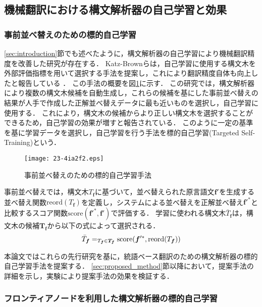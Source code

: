 \documentclass[japanese]{jnlp_1.4}
\newcommand{\argmax}{}
\begin{document}
\subsection{機械翻訳における構文解析器の自己学習と効果}

\subsubsection{事前並べ替えのための標的自己学習}
\label{sec:mt_selftrain}

\ref{sec:introduction}節でも述べたように，構文解析器の自己学習により機械翻訳精度を改善した研究が存在する．
Katz-Brownらは，自己学習に使用する構文木を外部評価指標を用いて選択する手法を提案し，これにより翻訳精度自体も向上したと報告している \cite{katzbrown11targetedselftraining}．
この手法の概要を図\ref{fig:katz-brown}に示す．
この研究では，構文解析器により複数の構文木候補を自動生成し，これらの候補を基にした事前並べ替えの結果が人手で作成した正解並べ替えデータに最も近いものを選択し，自己学習に使用する．
これにより，構文木の候補からより正しい構文木を選択することができるため，自己学習の効果が増すと報告されている．
このように一定の基準を基に学習データを選択し，自己学習を行う手法を標的自己学習(Targeted Self-Training)という．

\begin{figure}[b]
\begin{center}
\texttt{[image: 23-4ia2f2.eps]}
\end{center}
  \caption{事前並べ替えのための標的自己学習手法}
  \label{fig:katz-brown}
\end{figure}

事前並べ替えでは，構文木$T_{\bm{f}}$に基づいて，並べ替えられた原言語文$\bm{f}'$を生成する並べ替え関数$\text{reord}(T_{\bm{f}})$を定義し，システムによる並べ替えを正解並べ替え$\bm{f}'^{*}$と比較するスコア関数$\text{score}(\bm{f}'^{*}, \bm{f}')$で評価する．
学習に使われる構文木$\bar{T}_{\bm{f}}$は，構文木の候補$\bm{T_f}$から以下の式によって選択される．
\begin{equation}
\bar{T}_{\bm{f}}=\argmax_{T_{\bm{f}} \in {\bm{T}_{\bm{f}}}} {\rm score}(\bm{f}'^{*}, \text{reord}(T_{\bm{f}}))
\end{equation}

本論文ではこれらの先行研究を基に，統語ベース翻訳のための構文解析器の標的自己学習手法を提案する．
\ref{sec:proposed_method}節以降において，提案手法の詳細を示し，実験により提案手法の効果を検証する．


\subsubsection{フロンティアノードを利用した構文解析器の標的自己学習}
\label{sec:frontier_node}
\end{document}
